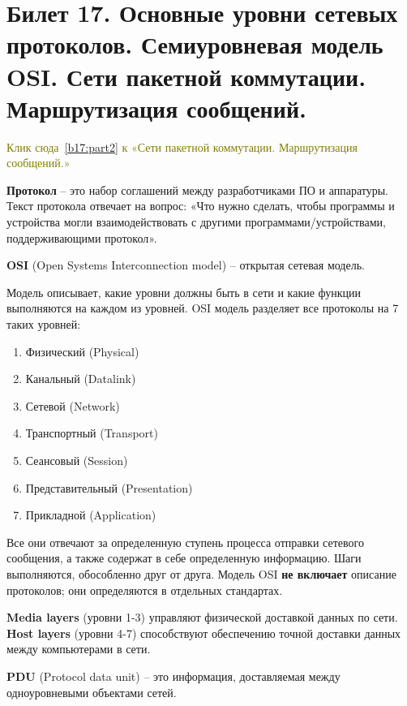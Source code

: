 \newpage
\section{Билет 17. Основные уровни сетевых протоколов. Семиуровневая модель OSI. Сети пакетной коммутации. Маршрутизация сообщений.}\label{b17:part1}

\textcolor{olive}{Клик сюда~\ref{b17:part2} к «Сети пакетной коммутации. Маршрутизация сообщений.»}

\textbf{Протокол} -- это набор соглашений между разработчиками ПО и аппаратуры. Текст протокола отвечает на вопрос: «Что нужно сделать, чтобы программы и устройства могли взаимодействовать с другими программами/устройствами, поддерживающими протокол».

\textbf{OSI} (Open Systems Interconnection model) -- открытая сетевая модель.

Модель описывает, какие уровни должны быть в сети и какие функции выполняются на каждом из уровней. OSI модель разделяет все протоколы на 7 таких уровней:
\begin{enumerate}
\item Физический (Physical)
\item Канальный (Datalink)
\item Сетевой (Network)
\item Транспортный (Transport)
\item Сеансовый (Session)
\item Представительный (Presentation)
\item Прикладной (Application)
\end{enumerate}

Все они отвечают за определенную ступень процесса отправки сетевого сообщения, а также содержат в себе определенную информацию. Шаги выполняются, обособленно друг от друга. Модель OSI \textbf{не включает} описание протоколов; они определяются в отдельных стандартах.

\textbf{Media layers} (уровни 1-3) управляют физической доставкой данных по сети. \\
\textbf{Host layers} (уровни 4-7) способствуют обеспечению точной доставки данных между компьютерами в сети.

\textbf{PDU} (Protocol data unit) -- это информация, доставляемая между одноуровневыми объектами сетей.

